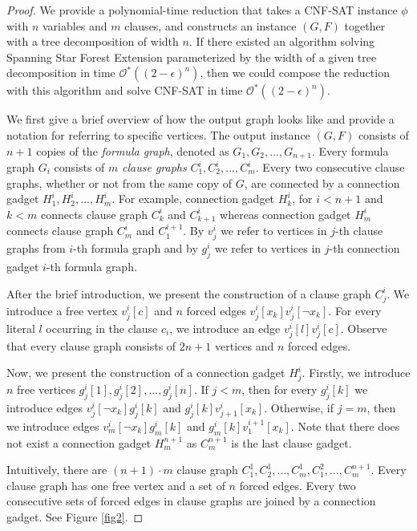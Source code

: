 \documentclass[en]{pracamgr}
\theoremstyle{definition}
\newcommand{\ssfep}{{\sc Spanning Star Forest Extension}}
\newcommand{\cnfsat}{{\sc CNF-SAT}}
\begin{document}
\thmssfeptwseth*

\begin{figure}
\end{figure}

\begin{proof}
	We provide a polynomial-time reduction that takes a \cnfsat{} instance $\phi$ with $n$ variables and $m$ clauses, and constructs an instance $(G,F)$ together with a tree decomposition of width $n$. If there existed an algorithm solving \ssfep{} parameterized by the width of a given tree decomposition in time  $\mathcal{O}^*((2-\epsilon)^n)$, then we could compose the reduction with this algorithm and solve \cnfsat{} in time  $\mathcal{O}^*((2-\epsilon)^n)$.
	
	We first give a brief overview of how the output graph looks like and provide a notation for referring to specific vertices. The output instance $(G,F)$ consists of $n+1$ copies of the \textit{formula graph}, denoted as $G_1,G_2,...,G_{n+1}$. Every formula graph $G_i$ consists of $m$ \textit{clause graphs} $C^i_1,C^i_2,...,C^i_m$. Every two consecutive clause graphs, whether or not from the same copy of $G$, are connected by a connection gadget $H^i_1,H^i_2,...,H^i_m$. For example, connection gadget $H^i_k$, for $i < n+1$ and $k < m$ connects clause graph $C^i_k$ and $C^i_{k+1}$ whereas connection gadget $H^i_m$ connects clause graph $C^i_m$ and $C^{i+1}_1$. By $v^i_j$ we refer to vertices in $j$-th clause graphs from $i$-th formula graph and by $g^i_j$ we refer to vertices in $j$-th connection gadget $i$-th formula graph.
	
	After the brief introduction, we present the construction of a clause graph $C^i_j$. We introduce a free vertex $v^i_j[c]$ and $n$ forced edges $v^i_j[x_k]v^i_j[\neg x_k]$. For every literal $l$ occurring in the clause $c_i$, we introduce an edge $v^i_j[l]v^i_j[c]$. Observe that every clause graph consists of $2n+1$ vertices and $n$ forced edges.
	
	Now, we present the construction of a connection gadget $H^i_j$. Firstly, we introduce $n$ free vertices $g^i_j[1],g^i_j[2],...,g^i_j[n]$. If $j < m$, then for every $g^i_j[k]$ we introduce edges $v^i_j[\neg x_k]g^i_j[k]$ and $g^i_j[k]v^i_{j+1}[x_k]$. Otherwise, if $j=m$, then we introduce edges $v^i_m[\neg x_k]g^i_m[k]$ and $g^i_m[k]v^{i+1}_1[x_k]$. Note that there does not exist a connection gadget $H^{n+1}_m$ as $C^{n+1}_m$ is the last clause gadget.
	
	
	Intuitively, there are $(n+1)\cdot m$ clause graph $C^1_1,C^1_2,\ldots,C^1_m,C^2_1,\ldots,C^{n+1}_m$. Every clause graph has one free vertex and a set of $n$ forced edges. Every two consecutive sets of forced edges in clause graphs are joined by a connection gadget. See Figure \ref{fig2}.
	

\end{proof}
\end{document}
